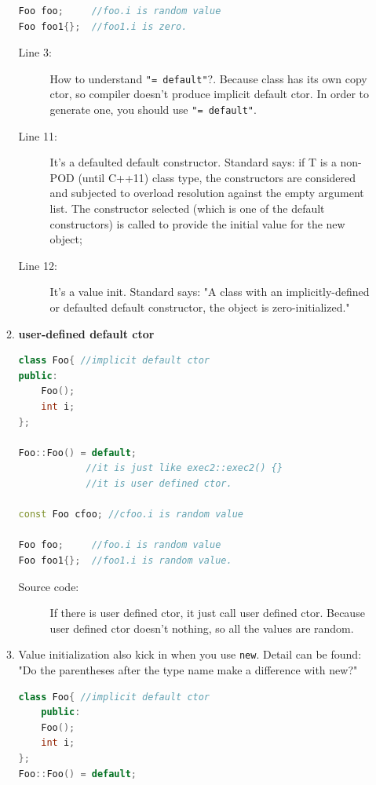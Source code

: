 \documentclass[a4paper,11pt,twoside]{book}
\begin{document}
\begin{itemize}
\begin{enumerate}
\begin{lstlisting}[frame=single, language=c++]
Foo foo;     //foo.i is random value
Foo foo1{};	 //foo1.i is zero.		 
\end{lstlisting}
\begin{description}			
	\item[Line 3:]  How to understand \texttt{"= default"}?. Because class has its own copy ctor, so compiler doesn't produce implicit default ctor. In order to generate one, you should use \texttt{"= default"}.
	
	\item[Line 11:] It's a defaulted default constructor.  Standard says: if T is a non-POD (until C++11) class type, the constructors are considered and subjected to overload resolution against the empty argument list. The constructor selected (which is one of the default constructors) is called to provide the initial value for the new object;
	
	\item[Line 12:] It's a value init. Standard says: "A class with an implicitly-defined or defaulted default constructor, the object is zero-initialized."
\end{description}


		\item \textbf{user-defined default ctor}
\begin{lstlisting}[frame=single, language=c++]
class Foo{ //implicit default ctor
public:
	Foo();
	int i;
};

Foo::Foo() = default; 
			//it is just like exec2::exec2() {}
			//it is user defined ctor.
			
const Foo cfoo; //cfoo.i is random value 
			
Foo foo;     //foo.i is random value
Foo foo1{};	 //foo1.i is random value.		 
\end{lstlisting}
\begin{description}			
	\item[Source code:] If there is user defined ctor, it just call user defined ctor. Because user defined ctor doesn't nothing, so all the values are random.
\end{description}
				
 
	\item Value initialization also kick in when you use \texttt{new}. Detail can be found: "Do the parentheses after the type name make a difference with new?"
	
\begin{lstlisting}[frame=single, language=c++]
class Foo{ //implicit default ctor
	public:
	Foo();
	int i;
};
Foo::Foo() = default; 	


\end{lstlisting}
\end{enumerate}
\end{itemize}
\end{document}
